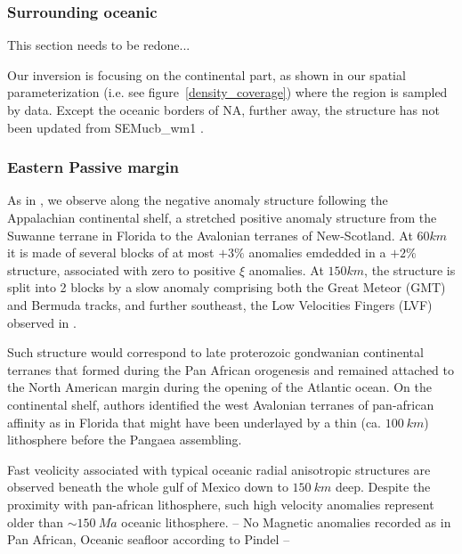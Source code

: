 \documentclass[12pt]{article}
\begin{document}


\subsubsection{Surrounding oceanic} This section needs to be redone...

	Our inversion is focusing on the continental part, as shown in our spatial parameterization (i.e. see figure~\ref{density_coverage}) where the region is sampled by data.
	Except the oceanic borders of NA, further away, the structure has not been updated from SEMucb\_wm1 \citep{french2014whole}. 

	\subsubsection{Eastern Passive margin}
		As in \cite{schaeffer2014imaging,yuan2014lithospheric,james2014rayleigh,silveira2002anisotropic,mocquet1990three}, we observe along the negative anomaly structure following the Appalachian continental shelf, a stretched positive anomaly structure from the Suwanne terrane in Florida to the Avalonian terranes of New-Scotland. 
		At $60km$ it is made of several blocks of at most $+3\%$ anomalies emdedded in a $+2\%$ structure, associated with zero to positive $\xi$ anomalies. At $150km$, the structure is split into 2 blocks by a slow anomaly comprising both the Great Meteor (GMT) and Bermuda tracks, and further southeast, the Low Velocities Fingers (LVF) observed in \cite{french2013waveform}. 

		Such structure would correspond to late proterozoic gondwanian continental terranes that formed during the Pan African orogenesis \citep{kennedy1964structural} and remained attached to the North American margin during the opening of the Atlantic ocean. \citep[e.g.][]{thomas2006tectonic}
		On the continental shelf, authors \citep[e.g.][]{o1983avalon,nance2002cordilleran} identified the west Avalonian terranes of pan-african affinity as in Florida \citep[see][]{smith1982review} that might have been underlayed by a thin (ca. $100 \: km$) lithosphere before the Pangaea assembling. \citep{mckenzie2015lithospheric}

		Fast veolicity associated with typical oceanic radial anisotropic structures are observed beneath the whole gulf of Mexico down to $150 \: km$ deep. Despite the proximity with pan-african lithosphere, such high velocity anomalies represent older than $\sim 150 \: Ma$ oceanic lithosphere. \citep{muller2008age,pindell2009tectonic}
		-- No Magnetic anomalies recorded as in Pan African, Oceanic seafloor according to Pindel --
\end{document}
